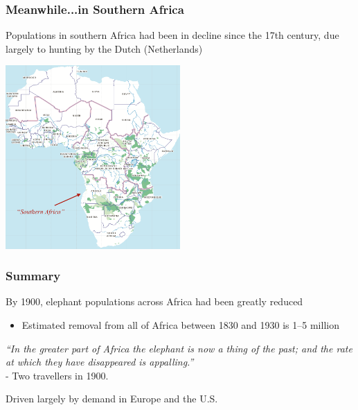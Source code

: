 \documentclass[10pt]{beamer}
\begin{document}
\begin{frame}[t]
\frametitle{Meanwhile...in Southern Africa}
\vspace{0.5cm}

	Populations in southern Africa had been in decline since the 17th century, due largely to hunting by the Dutch (Netherlands) \\
	
	\vspace{0.5cm}
	
	\begin{center}
		\includegraphics[width=0.5\textwidth]{figures/southern1.png}
	\end{center}
\end{frame}


\begin{frame}[t]
\frametitle{Summary}
\vspace{0.5cm}

	By 1900, elephant populations across Africa had been greatly reduced\\
		\medskip
		\begin{itemize}
			\item Estimated removal from all of Africa between 1830 and 1930 is 1--5 million
		\end{itemize}
	
	\vspace{0.5cm}
	
	\begin{center}
		\emph{``In the greater part of Africa the elephant is now a thing of the past; and the rate at which they have disappeared is appalling.''} \\- Two travellers in 1900.\\
	\end{center}
	
	\vspace{0.5cm}
	
	Driven largely by demand in Europe and the U.S. 
	
	\vspace{0.5cm}
	
\end{frame}
\end{document}
